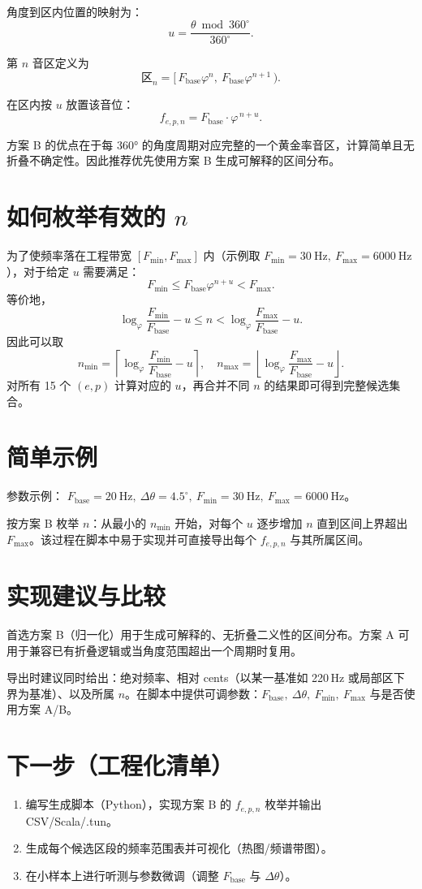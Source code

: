 \documentclass{article}
\begin{document}
角度到区内位置的映射为：
\[
u=\frac{\theta \bmod 360^\circ}{360^\circ}.
\]

第 \(n\) 音区定义为
\[
\text{区}_n=[\,F_{\mathrm{base}}\varphi^{n},\ F_{\mathrm{base}}\varphi^{n+1}\,).
\]

在区内按 \(u\) 放置该音位：
\[
f_{e,p,n} = F_{\mathrm{base}}\cdot \varphi^{\,n+u}.
\]

方案 B 的优点在于每 360° 的角度周期对应完整的一个黄金率音区，计算简单且无折叠不确定性。因此推荐优先使用方案 B 生成可解释的区间分布。

\section*{如何枚举有效的 \(n\)}
为了使频率落在工程带宽 \([F_{\min},F_{\max}]\) 内（示例取 \(F_{\min}=30\ \mathrm{Hz},\ F_{\max}=6000\ \mathrm{Hz}\)），对于给定 \(u\) 需要满足：
\[
F_{\min}\le F_{\mathrm{base}}\varphi^{n+u}<F_{\max}.
\]
等价地，
\[
\log_{\varphi}\frac{F_{\min}}{F_{\mathrm{base}}}-u \le n < \log_{\varphi}\frac{F_{\max}}{F_{\mathrm{base}}}-u.
\]
因此可以取
\[
n_{\min}=\left\lceil \log_{\varphi}\frac{F_{\min}}{F_{\mathrm{base}}}-u \right\rceil,\quad
n_{\max}=\left\lfloor \log_{\varphi}\frac{F_{\max}}{F_{\mathrm{base}}}-u \right\rfloor.
\]
对所有 15 个 \((e,p)\) 计算对应的 \(u\)，再合并不同 \(n\) 的结果即可得到完整候选集合。

\section*{简单示例}
参数示例： \(F_{\mathrm{base}}=20\ \mathrm{Hz},\ \Delta\theta=4.5^\circ,\ F_{\min}=30\ \mathrm{Hz},\ F_{\max}=6000\ \mathrm{Hz}\)。

按方案 B 枚举 \(n\)：从最小的 \(n_{\min}\) 开始，对每个 \(u\) 逐步增加 \(n\) 直到区间上界超出 \(F_{\max}\)。该过程在脚本中易于实现并可直接导出每个 \(f_{e,p,n}\) 与其所属区间。

\section*{实现建议与比较}
首选方案 B（归一化）用于生成可解释的、无折叠二义性的区间分布。方案 A 可用于兼容已有折叠逻辑或当角度范围超出一个周期时复用。

导出时建议同时给出：绝对频率、相对 cents（以某一基准如 220\,Hz 或局部区下界为基准）、以及所属 \(n\)。在脚本中提供可调参数：\(F_{\mathrm{base}},\ \Delta\theta,\ F_{\min},\ F_{\max}\) 与是否使用方案 A/B。

\section*{下一步（工程化清单）}
\begin{enumerate}
  \item 编写生成脚本（Python），实现方案 B 的 \(f_{e,p,n}\) 枚举并输出 CSV/Scala/.tun。
  \item 生成每个候选区段的频率范围表并可视化（热图/频谱带图）。
  \item 在小样本上进行听测与参数微调（调整 \(F_{\mathrm{base}}\) 与 \(\Delta\theta\)）。
\end{enumerate}
\end{document}
